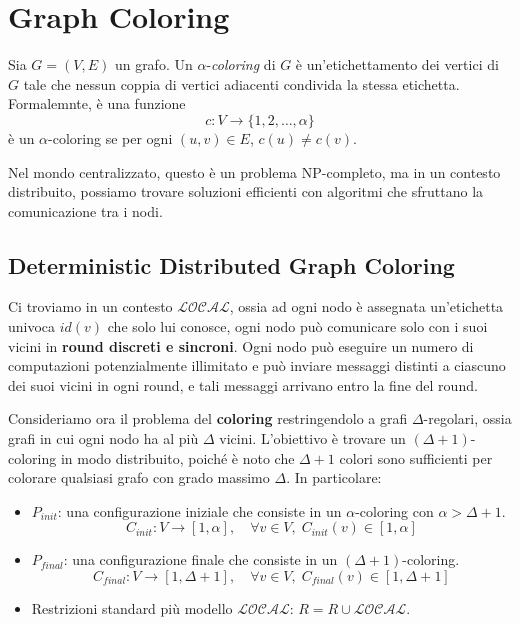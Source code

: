 \chapter{Graph Coloring}

\begin{definizione}
    Sia $G = (V, E)$ un grafo. Un $\alpha$-\textit{coloring} di $G$ è un'etichettamento dei vertici di $G$ tale che nessun coppia di vertici adiacenti condivida la stessa etichetta. Formalemnte, è una funzione
    \[
        c: V \to \{1, 2, \ldots, \alpha\}
    \]
    è un $\alpha$-coloring se per ogni $(u, v) \in E$, $c(u) \neq c(v)$.
\end{definizione}

Nel mondo centralizzato, questo è un problema NP-completo, ma in un contesto distribuito, possiamo trovare soluzioni efficienti con algoritmi che sfruttano la comunicazione tra i nodi.

\section{Deterministic Distributed Graph Coloring}

Ci troviamo in un contesto $\mathcal{LOCAL}$, ossia ad ogni nodo è assegnata un'etichetta univoca $id(v)$ che solo lui conosce, ogni nodo può comunicare solo con i suoi vicini in \textbf{round discreti e sincroni}. Ogni nodo può eseguire un numero di computazioni potenzialmente illimitato e può inviare messaggi distinti a ciascuno dei suoi vicini in ogni round, e tali messaggi arrivano entro la fine del round.

Consideriamo ora il problema del \textbf{coloring} restringendolo a grafi $\Delta$-regolari, ossia grafi in cui ogni nodo ha al più $\Delta$ vicini. L'obiettivo è trovare un $(\Delta + 1)$-coloring in modo distribuito, poiché è noto che $\Delta + 1$ colori sono sufficienti per colorare qualsiasi grafo con grado massimo $\Delta$. In particolare:

\begin{itemize}
    \item $P_{init}$: una configurazione iniziale che consiste in un $\alpha$-coloring con $\alpha > \Delta + 1$.
    $$C_{init}: V \to [1, \alpha], \quad \forall v \in V, \; C_{init}(v) \in [1, \alpha]$$
    \item $P_{final}$: una configurazione finale che consiste in un $(\Delta + 1)$-coloring.
    $$C_{final}: V \to [1, \Delta + 1], \quad \forall v \in V, \; C_{final}(v) \in [1, \Delta + 1]$$
    \item Restrizioni standard più modello $\mathcal{LOCAL}$: $R = R \cup \mathcal{LOCAL}$.
\end{itemize}

